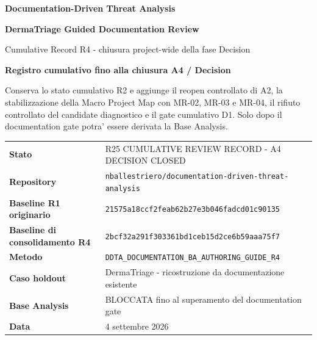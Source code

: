 \documentclass[11pt,a4paper]{article}
\begin{document}

\begin{titlepage}
\thispagestyle{empty}
\vspace*{8mm}

{\sffamily\bfseries\color{DDTANavy}\fontsize{15}{18}\selectfont Documentation-Driven Threat Analysis}\par
\vspace{5mm}
{\sffamily\bfseries\color{DDTANavy}\fontsize{29}{33}\selectfont DermaTriage Guided Documentation Review}\par
\vspace{2mm}
{\sffamily\color{DDTABlue}\fontsize{18}{22}\selectfont Cumulative Record R4 - chiusura project-wide della fase Decision}\par

\vspace{10mm}
\begin{tcolorbox}[enhanced,arc=3pt,boxrule=0pt,colback=DDTANavy,left=12pt,right=12pt,top=11pt,bottom=11pt]
{\color{white}\sffamily\bfseries\large Registro cumulativo fino alla chiusura A4 / Decision}\par
\vspace{2mm}
{\color{white!88}\small Conserva lo stato cumulativo R2 e aggiunge il reopen controllato di A2, la stabilizzazione della Macro Project Map con MR-02, MR-03 e MR-04, il rifiuto controllato del candidate diagnostico e il gate cumulativo D1. Solo dopo il documentation gate potra' essere derivata la Base Analysis.}
\end{tcolorbox}

\vspace{8mm}
\begin{tabularx}{\textwidth}{L{42mm}Y}
\toprule
\textbf{Stato} & R25 CUMULATIVE REVIEW RECORD - A4 DECISION CLOSED \\
\textbf{Repository} & \texttt{nballestriero/documentation-driven-threat-analysis} \\
\textbf{Baseline R1 originario} & \texttt{21575a18ccf2feab62b27e3b046fadcd01c90135} \\
\textbf{Baseline di consolidamento R4} & \texttt{2bcf32a291f303361bd1ceb15d2ce6b59aaa75f7} \\
\textbf{Metodo} & \texttt{DDTA\_DOCUMENTATION\_BA\_AUTHORING\_GUIDE\_R4} \\
\textbf{Caso holdout} & DermaTriage - ricostruzione da documentazione esistente \\
\textbf{Base Analysis} & BLOCCATA fino al superamento del documentation gate \\
\textbf{Data} & 4 settembre 2026 \\
\bottomrule
\end{tabularx}


\end{titlepage}
\end{document}
